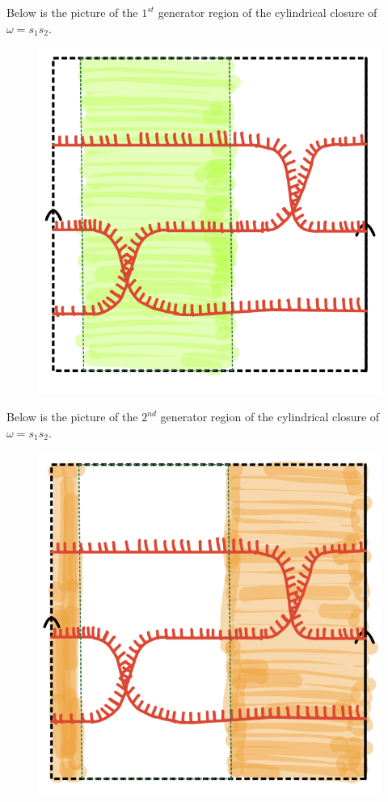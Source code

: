 Below is the picture of the $1^{st}$ generator region of the cylindrical closure of $\omega = s_1 s_2$.

\begin{figure}[H] 
    \centering
    \includegraphics[scale = 0.55]{diagrams/natural_alternating_diagrams/6-1.png}
    \caption{}
    \label{fig:your-label}
\end{figure}

Below is the picture of the $2^{nd}$ generator region of the cylindrical closure of $\omega = s_1 s_2$.

\begin{figure}[H] 
    \centering
    \includegraphics[scale = 0.55]{diagrams/natural_alternating_diagrams/6-2.png}
    \caption{}
    \label{fig:your-label}
\end{figure}

